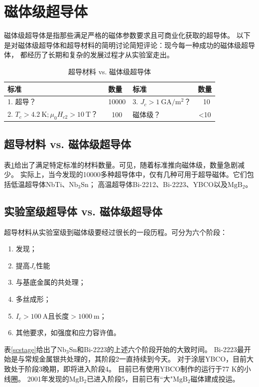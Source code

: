 \section{磁体级超导体}
磁体级超导体是指那些满足严格的磁体参数要求且可商业化获取的超导体。
以下是对磁体级超导体和超导材料的简明讨论简短评论：现今每一种成功的磁体级超导体，
都经历了长期和复杂的发展过程才从实验室走出。
\begin{table}[htbp]\small
  \centering
  \caption{超导材料 vs. 磁体级超导体} \label{scmaterialvsconductor}
\begin{tabular}{|l|c|l|c|}
  \hline
  标准 & 数量 & 标准 & 数量 \\ \hline
  1. 超导？ & ~10000 & 3. $J_c>1\ \mathrm{GA/m^2}$？ & ~10 \\ \hline
  2. $T_c> 4.2\ \mathrm{K};\mu_0 H_{c2}>10\ \mathrm{T}$？ &~100 & 磁体级？ & <10 \\
  \hline
\end{tabular}
\end{table}

\subsection{超导材料 vs. 磁体级超导体}
表\ref{scmaterialvsconductor}给出了满足特定标准的材料数量。可见，随着标准推向磁体级，数量急剧减少。
实际上，当今发现的10000多种超导体中，仅有几种可用于超导磁体。它们包括低温超导体NbTi、$\mathrm{Nb_3Sn}$；
高温超导体Bi-2212、Bi-2223、YBCO以及$\mathrm{MgB_2}$。

\subsection{实验室级超导体 vs. 磁体级超导体}
超导材料从实验室级到磁体级要经过很长的一段历程。可分为六个阶段：
\begin{enumerate}
  \item 发现；
  \item 提高$J_c$性能
  \item 与基底金属的共处理；
  \item 多丝成形；
  \item $I_c>100\ \mathrm{A}$且长度$>1000\ \mathrm{m}$；
  \item 其他要求，如强度和应力容许值。
\end{enumerate}

表\ref{scstage}给出了$\mathrm{Nb_3Sn}$和Bi-2223的上述六个阶段开始的大致时间。
Bi-2223最开始是与常规金属银共处理的，其阶段2一直持续到今天。
对于涂层YBCO，目前大致处于阶段3晚期，即将进入阶段4。
目前已有使用YBCO制作的运行于77 K的小线圈。
2001年发现的$\mathrm{MgB_2}$已进入阶段5，目前已有``大"$\mathrm{MgB_2}$磁体建成投运。

